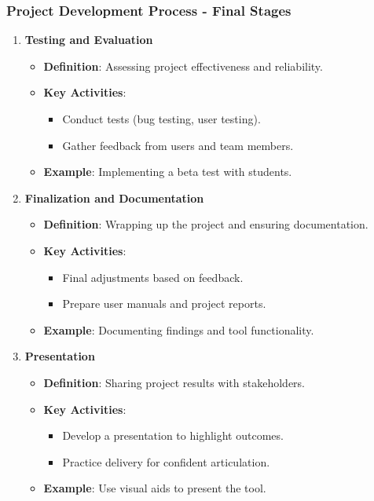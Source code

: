 \documentclass[aspectratio=169]{beamer}
\begin{document}
\begin{frame}[fragile]
    \frametitle{Project Development Process - Final Stages}
    \begin{enumerate}[resume]
        \item \textbf{Testing and Evaluation}
            \begin{itemize}
                \item \textbf{Definition}: Assessing project effectiveness and reliability.
                \item \textbf{Key Activities}:
                    \begin{itemize}
                        \item Conduct tests (bug testing, user testing).
                        \item Gather feedback from users and team members.
                    \end{itemize}
                \item \textbf{Example}: Implementing a beta test with students.
            \end{itemize}

        \item \textbf{Finalization and Documentation}
            \begin{itemize}
                \item \textbf{Definition}: Wrapping up the project and ensuring documentation.
                \item \textbf{Key Activities}:
                    \begin{itemize}
                        \item Final adjustments based on feedback.
                        \item Prepare user manuals and project reports.
                    \end{itemize}
                \item \textbf{Example}: Documenting findings and tool functionality.
            \end{itemize}

        \item \textbf{Presentation}
            \begin{itemize}
                \item \textbf{Definition}: Sharing project results with stakeholders.
                \item \textbf{Key Activities}:
                    \begin{itemize}
                        \item Develop a presentation to highlight outcomes.
                        \item Practice delivery for confident articulation.
                    \end{itemize}
                \item \textbf{Example}: Use visual aids to present the tool.
            \end{itemize}
    \end{enumerate}
\end{frame}
\end{document}
